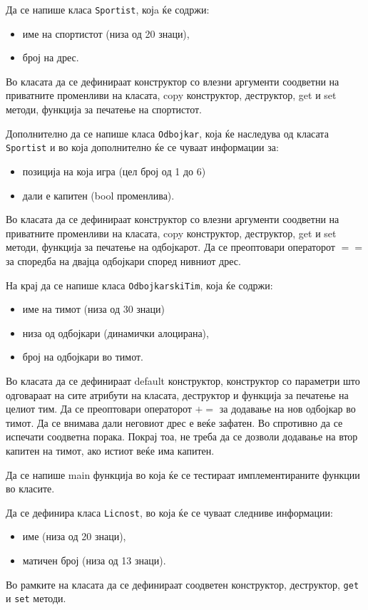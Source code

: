 \documentclass[12pt,a4paper]{exam}
\begin{document}
\begin{questions}
\question
Да се напише класа \texttt{Sportist}, којa ќе содржи:
\begin{itemize}
  \item име на спортистот (низа од 20 знаци),
  \item број на дрес.
\end{itemize}
Во класата да се дефинираат конструктор со влезни аргументи соодветни на
приватните променливи на класата, copy конструктор, деструктор, get и set
методи, функција за печатење на спортистот. 

Дополнително да се напише класа \texttt{Odbojkar}, која ќе наследува од класата
\texttt{Sportist} и во која дополнително ќе се чуваат информации за:
\begin{itemize}
  \item позиција на која игра (цел број од 1 до 6)
  \item дали е капитен (bool променлива).
\end{itemize}
Во класата да се дефинираат конструктор со влезни аргументи соодветни на
приватните променливи на класата, copy конструктор, деструктор, get и set
методи, функција за печатење на одбојкарот. Да се преоптовари операторот $==$ за
споредба на двајца одбојкари според нивниот дрес.

На крај да се напише класа \texttt{OdbojkarskiTim}, која ќе содржи:
\begin{itemize}
  \item име на тимот (низа од 30 знаци)
  \item низа од одбојкари (динамички алоцирана),
  \item број на одбојкари во тимот.
\end{itemize}
Во класата да се дефинираат default конструктор, конструктор со параметри што
одговараат на сите атрибути на класата, деструктор и функција за печатење на
целиот тим. Да се преоптовари операторот $+=$ за додавање на нов одбојкар
во тимот. Да се внимава дали неговиот дрес е веќе зафатен. Во спротивно да се
испечати соодветна порака. Покрај тоа, не треба да се дозволи додавање на втор
капитен на тимот, ако истиот веќе има капитен.

Да се напише main функција во која ќе се тестираат имплементираните функции во
класите.

\question
Да се дефинира класа \texttt{Licnost}, во која ќе се чуваат следниве информации:
\begin{itemize}
  \item име (низа од 20 знаци),
  \item матичен број (низа од 13 знаци).
\end{itemize}
Во рамките на класата да се дефинираат соодветен конструктор, деструктор, \texttt{get} и
\texttt{set} методи. 


\end{questions}
\end{document}
